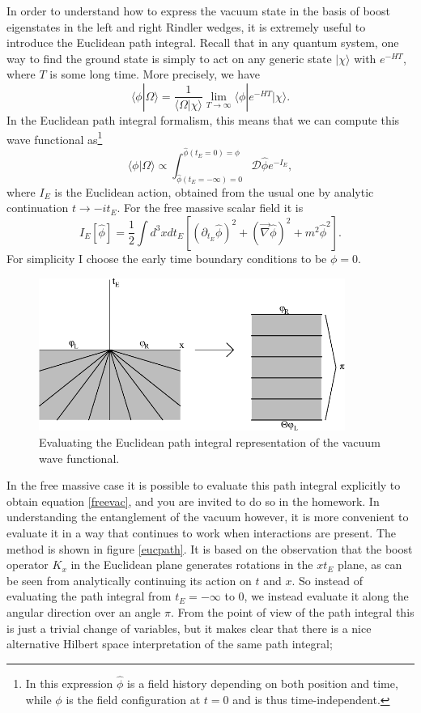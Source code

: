 \documentclass[12pt]{article}
\newcommand{\be}{\begin{equation}}
\newcommand{\ee}{\end{equation}}
\newcommand{\lan}{\langle}
\newcommand{\ran}{\rangle}
\begin{document}
In order to understand how to express the vacuum state in the basis of boost eigenstates in the left and right Rindler wedges, it is extremely useful to introduce the Euclidean path integral.  Recall that in any quantum system, one way to find the ground state is simply to act on any generic state $|\chi\ran$ with $e^{-H T}$, where $T$ is some long time.  More precisely, we have
\be
\lan\phi|\Omega\ran=\frac{1}{\lan\Omega|\chi\ran}\lim_{T\to \infty}\lan\phi|e^{-H T} |\chi\ran.
\ee
In the Euclidean path integral formalism, this means that we can compute this wave functional as\footnote{In this expression $\hat{\phi}$ is a field history depending on both position and time, while $\phi$ is the field configuration at $t=0$ and is thus time-independent.}  
\be\label{epath}
\lan\phi|\Omega\ran\propto\int_{\hat{\phi}(t_E=-\infty)=0}^{\hat{\phi}(t_E=0)=\phi} \mathcal{D}\hat{\phi}e^{-I_E},
\ee
where $I_E$ is the Euclidean action, obtained from the usual one by analytic continuation $t \to -i t_E$.  For the free massive scalar field it is 
\be
I_E[\hat{\phi}]=\frac{1}{2}\int d^3x dt_E \left[(\partial_{t_E}\hat{\phi})^2+(\vec{\nabla}\hat{\phi})^2+m^2\hat{\phi}^2\right].
\ee
For simplicity I choose the early time boundary conditions to be $\phi=0$.  
\begin{figure}
\begin{center}
\includegraphics[height=5cm]{eucpath.pdf}
\caption{Evaluating the Euclidean path integral representation of the vacuum wave functional.}\label{eucpath}
\end{center}
\end{figure}
In the free massive case it is possible to evaluate this path integral explicitly to obtain equation \eqref{freevac}, and you are invited to do so in the homework.  In understanding the entanglement of the vacuum however, it is more convenient to evaluate it in a way that continues to work when interactions are present.  The method is shown in figure \eqref{eucpath}.  It is based on the observation that the boost operator $K_x$ in the Euclidean plane generates rotations in the $xt_E$ plane, as can be seen from analytically continuing its action on $t$ and $x$.  So instead of evaluating the path integral from $t_E=-\infty$ to $0$, we instead evaluate it along the angular direction over an angle $\pi$.  From the point of view of the path integral this is just a trivial change of variables, but it makes clear that there is a nice alternative Hilbert space interpretation of the same path integral;
\end{document}
